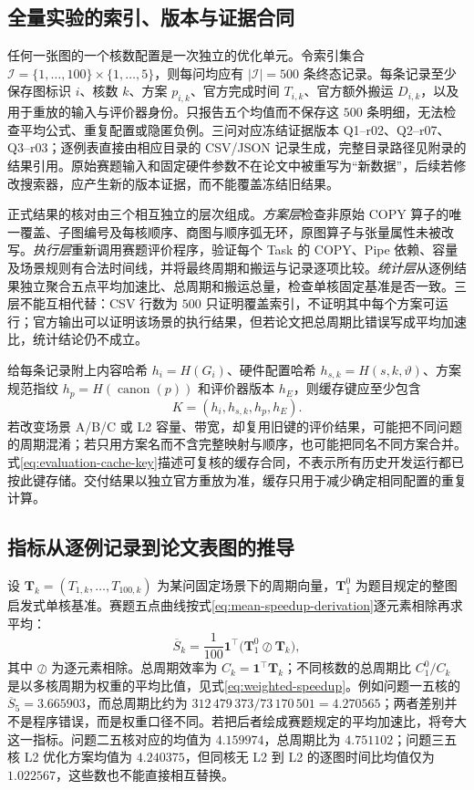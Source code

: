 \subsection{全量实验的索引、版本与证据合同}
任何一张图的一个核数配置是一次独立的优化单元。令索引集合 $\mathcal I=\{1,\ldots,100\}\times\{1,\ldots,5\}$，则每问均应有 $|\mathcal I|=500$ 条终态记录。每条记录至少保存图标识 $i$、核数 $k$、方案 $p_{i,k}$、官方完成时间 $T_{i,k}$、官方额外搬运 $D_{i,k}$，以及用于重放的输入与评价器身份。只报告五个均值而不保存这 $500$ 条明细，无法检查平均公式、重复配置或隐匿负例。三问对应冻结证据版本 Q1--r02、Q2--r07、Q3--r03；逐例表直接由相应目录的 CSV/JSON 记录生成，完整目录路径见附录的结果引用。原始赛题输入和固定硬件参数不在论文中被重写为“新数据”，后续若修改搜索器，应产生新的版本证据，而不能覆盖冻结旧结果。

正式结果的核对由三个相互独立的层次组成。\emph{方案层}检查非原始 COPY 算子的唯一覆盖、子图编号及每核顺序、商图与顺序弧无环，原图算子与张量属性未被改写。\emph{执行层}重新调用赛题评价程序，验证每个 Task 的 COPY、Pipe 依赖、容量及场景规则有合法时间线，并将最终周期和搬运与记录逐项比较。\emph{统计层}从逐例结果独立聚合五点平均加速比、总周期和搬运总量，检查单核固定基准是否一致。三层不能互相代替：CSV 行数为 $500$ 只证明覆盖索引，不证明其中每个方案可运行；官方输出可以证明该场景的执行结果，但若论文把总周期比错误写成平均加速比，统计结论仍不成立。

给每条记录附上内容哈希 $h_i=H(G_i)$、硬件配置哈希 $h_{s,k}=H(s,k,\vartheta)$、方案规范指纹 $h_p=H(\operatorname{canon}(p))$ 和评价器版本 $h_E$，则缓存键应至少包含
\begin{equation}\label{eq:evaluation-cache-key}
K=(h_i,h_{s,k},h_p,h_E).
\end{equation}
若改变场景 A/B/C 或 L2 容量、带宽，却复用旧键的评价结果，可能把不同问题的周期混淆；若只用方案名而不含完整映射与顺序，也可能把同名不同方案合并。式\eqref{eq:evaluation-cache-key}描述可复核的缓存合同，不表示所有历史开发运行都已按此键存储。交付结果以独立官方重放为准，缓存只用于减少确定相同配置的重复计算。

\subsection{指标从逐例记录到论文表图的推导}
设 $\mathbf T_k=(T_{1,k},\ldots,T_{100,k})$ 为某问固定场景下的周期向量，$\mathbf T_1^0$ 为题目规定的整图启发式单核基准。赛题五点曲线按式\eqref{eq:mean-speedup-derivation}逐元素相除再求平均：
\begin{equation}\label{eq:validation-vector-mean}
\overline S_k=\frac1{100}\mathbf 1^\top
\bigl(\mathbf T_1^0\oslash\mathbf T_k\bigr),
\end{equation}
其中 $\oslash$ 为逐元素相除。总周期效率为 $C_k=\mathbf 1^\top\mathbf T_k$；不同核数的总周期比 $C_1^0/C_k$ 是以多核周期为权重的平均比值，见式\eqref{eq:weighted-speedup}。例如问题一五核的 $\overline S_5=3.665903$，而总周期比约为 $312\,479\,373/73\,170\,501=4.270565$；两者差别并不是程序错误，而是权重口径不同。若把后者绘成赛题规定的平均加速比，将夸大这一指标。问题二五核对应的均值为 $4.159974$，总周期比为 $4.751102$；问题三五核 L2 优化方案均值为 $4.240375$，但同核无 L2 到 L2 的逐图时间比均值仅为 $1.022567$，这些数也不能直接相互替换。

